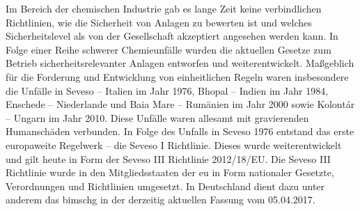 Im Bereich der chemischen Industrie gab es lange Zeit keine verbindlichen Richtlinien, wie die Sicherheit von Anlagen zu bewerten ist und welches Sicherheitslevel als von der Gesellschaft akzeptiert angesehen werden kann. In Folge einer Reihe schwerer Chemieunf\"alle wurden die aktuellen Gesetze zum Betrieb sicherheitsrelevanter Anlagen entworfen und weiterentwickelt.\newline
Ma\ss{}geblich f\"ur die Forderung und Entwicklung von einheitlichen Regeln waren insbesondere die Unf\"alle in Seveso -- Italien im Jahr 1976, Bhopal -- Indien im Jahr 1984, Enschede -- Niederlande und Baia Mare -- Rum\"anien im Jahr 2000 sowie Kolont\'ar -- Ungarn im Jahr 2010. Diese Unf\"alle waren allesamt mit gravierenden Humansch\"aden verbunden. In Folge des Unfalls in Seveso 1976 entstand das erste europaweite Regelwerk -- die {Seveso I} Richtlinie. Dieses  wurde weiterentwickelt und gilt heute in Form der {Seveso III} Richtlinie 2012/18/EU. Die {Seveso III} Richtlinie wurde in den Mitgliedsstaaten der \ac{eu} in Form nationaler Gesetzte, Verordnungen und Richtlinien umgesetzt. In Deutschland dient dazu unter anderem das \ac{bimschg} in der derzeitig aktuellen Fassung vom 05.04.2017.

